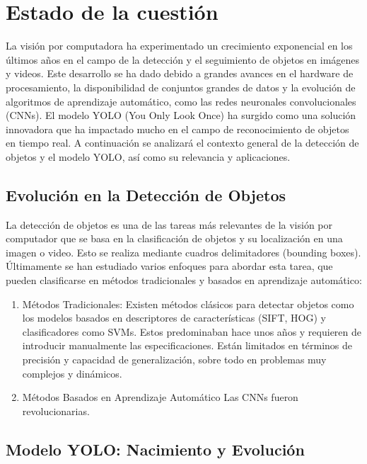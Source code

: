 \section{Estado de la cuestión}

La visión por computadora ha experimentado un crecimiento exponencial en los últimos años en el campo de la detección y el seguimiento de objetos en imágenes y videos. Este desarrollo se ha dado debido a grandes avances en el hardware de procesamiento, la disponibilidad de conjuntos grandes de datos y la evolución de algoritmos de aprendizaje automático, como las redes neuronales convolucionales (CNNs). El modelo YOLO (You Only Look Once) ha surgido como una solución innovadora que ha impactado mucho en el campo de reconocimiento de objetos en tiempo real.
\noindent
A continuación se analizará el contexto general de la detección de objetos y el modelo YOLO, así como su relevancia y aplicaciones.
\subsection{Evolución en la Detección de Objetos}

La detección de objetos es una de las tareas más relevantes de la visión por computador que se basa en la clasificación de objetos y su localización en una imagen o video.  Esto se realiza mediante cuadros delimitadores (bounding boxes). Últimamente se han estudiado varios enfoques para abordar esta tarea, que pueden clasificarse en métodos tradicionales y basados en aprendizaje automático:
\begin{enumerate}
    \item Métodos Tradicionales:
    Existen métodos clásicos para detectar objetos como los modelos basados en descriptores de características (SIFT, HOG) y clasificadores como SVMs.  Estos predominaban hace unos años y requieren de introducir manualmente las especificaciones.  Están limitados en términos de precisión y capacidad de generalización, sobre todo en problemas muy complejos y dinámicos.
    \item Métodos Basados en Aprendizaje Automático
    Las CNNs fueron revolucionarias.      
\end{enumerate}

\subsection{Modelo YOLO: Nacimiento y Evolución}


